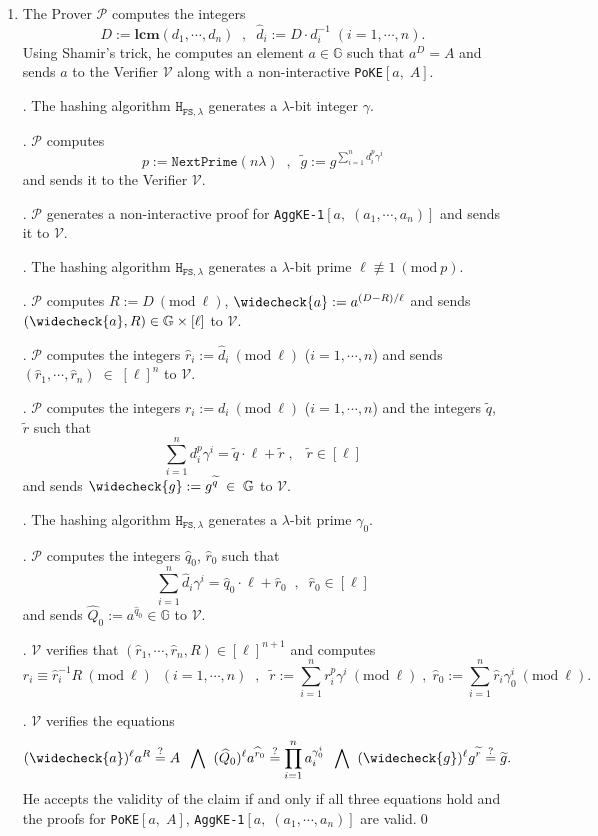 \documentclass[11pt, lettersize, notitlepage, leqno, footskip=0.6cm]{article}
\newcommand{\pl}{\prod\limits}
\newcommand{\slim}{\sum\limits}
\newcommand{\ttt}{\texttt}
\newcommand{\bG}{\mathbb{G}}
\newcommand{\wti}{\widetilde}
\newcommand{\mc}{\mathcal}
\newcommand{\mb}{\mathbb}
\newcommand{\mbf}{\mathbf}
\newcommand{\lam}{\lambda}
\newcommand{\what}{\widehat}
\newcommand{\weck}{\widecheck}
\newcommand{\vs}{\vspace{-0.15cm}}
\newcommand{\noin}{\noindent}
\newcommand{\sta}{\stackrel{?}{=}}
\newcommand{\Mod}[1]{\ (\mathrm{mod}\ #1)}
\newcommand{\LCM}{\mbf{lcm}}
\numberwithin{equation}{section}
\begin{document}
\begin{enumerate}[wide, labelwidth=!, labelindent=0pt]\vs \item The Prover $\mc{P}$ computes the integers \vs $$D:= \LCM(d_1,\cdots,d_n)\;\;,\;\;\what{d}_i:= D\cdot d_i^{-1}\;(i=1,\cdots,n).$$ Using Shamir's trick, he computes an element $a\in\mb{G}$ such that $a^D = A$ and sends $a$ to the Verifier $\mc{V}$ along with a non-interactive \verb|PoKE|$[a,\;A]$.

\noin 2. The hashing algorithm $\ttt{H}_{\ttt{FS},\lam}$ generates a $\lam$-bit integer $\gamma$.

\noin 3. $\mc{P}$ computes $$p:= \ttt{NextPrime}(n\lam)\;\;,\;\;\wti{g} := g^{\slim_{i=1}^n d_i^{p}\gamma^i}$$ and sends it to the Verifier $\mc{V}$. 

\noin 4. $\mc{P}$ generates a non-interactive proof for \verb|AggKE-1|$[a,\;(a_1,\cdots,a_n)]$ and sends it to $\mc{V}$.

\noin 5. The hashing algorithm $\ttt{H}_{\ttt{FS},\lam}$ generates a $\lam$-bit prime $\ell\not\equiv 1\Mod{p}$.

\noin 6. $\mc{P}$ computes $R:= D\Mod{\ell}$, $\weck{a}:= a^{(D-R)/\ell}$ and sends $(\weck{a}, R)\in \bG\times [\ell]$ to $\mc{V}$.

\noin 7. $\mc{P}$ computes the integers $\what{r}_i:= \what{d}_i\Mod{\ell}$ ($i=1,\cdots,n$) and sends $(\what{r}_1,\cdots,\what{r}_n)\;\in\;[\ell]^n$ to $\mc{V}$.

\noin 8. $\mc{P}$ computes the integers ${r}_i:= {d}_i\Mod{\ell}$ ($i=1,\cdots,n$) and the integers $\wti{q}$, $\wti{r}$ such that \vs $$\slim_{i=1}^n {d}_i^{p}\gamma^i = \wti{q} \cdot \ell+\wti{r}\;,\;\;\;\wti{r}\in[\ell] $$ and sends $\weck{g}:= g^{\wti{q}}\;\in\;\bG$ to $\mc{V}$.

\noin 9. The hashing algorithm $\ttt{H}_{\ttt{FS},\lam}$ generates a $\lam$-bit prime $\gamma_{0}$.

\noin 10. $\mc{P}$ computes the integers $\what{q}_0$, $\what{r}_0$ such that \vs $$\slim_{i=1}^n \what{d}_i\gamma^i = \what{q}_0 \cdot \ell+\what{r}_0\;\;,\;\;\what{r}_0\in[\ell]$$ and sends $\what{Q}_0:= a^{\what{q}_0}\in \bG$ to $\mc{V}$.

\noin 11. $\mc{V}$ verifies that $(\what{r}_1,\cdots,\what{r}_n, R)\in [\ell]^{n+1}$ and computes \vs $$r_i\equiv \what{r}_i^{-1}R\Mod{\ell}\;\; (i=1,\cdots,n)\;\;,\;\;\wti{r}:= {\slim_{i=1}^n r_i^{p}\gamma^i}\Mod{\ell}\;,\; \what{r}_0:= \slim_{i=1}^n \what{r}_i\gamma_{0}^i\Mod{\ell}.$$

\noin 12. $\mc{V}$ verifies the equations \vs $$(\weck{a})^{\ell}a^R\sta A \; \;\bigwedge\;\;(\what{Q}_0)^{\ell}a^{\what{r}_0}\sta \pl_{i=1}^{n} a_i^{\gamma_{0}^i} \;\;\bigwedge\;\; (\weck{g})^{\ell}g^{\wti{r}} \sta \wti{g}.$$ He accepts the validity of the claim if and only if all three equations hold and the proofs for \verb|PoKE|$[a,\;A]$, \verb|AggKE-1|$[a,\;(a_1,\cdots,a_n)]$ are valid.\qed \end{enumerate}
\end{document}
